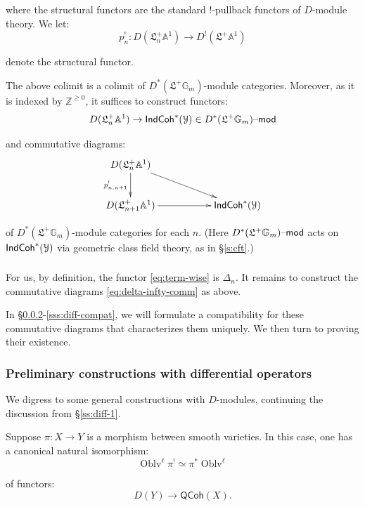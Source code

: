 \documentclass[reqno,11pt]{amsart}
\numberwithin{equation}{subsection}
\theoremstyle{remark}
\newcommand{\bA}{{\mathbb A}}
\newcommand{\bG}{{\mathbb G}}
\newcommand{\bZ}{{\mathbb Z}}
\newcommand{\sY}{{\EuScript Y}}
\newcommand{\fL}{{\mathfrak L}}
\newcommand{\on}{\operatorname}
\newcommand{\mathendash}{\text{\textendash}}
\renewcommand{\mod}{\mathendash\mathsf{mod}}
\newcommand{\Oblv}{\on{Oblv}}
\newcommand{\IndCoh}{\mathsf{IndCoh}}
\newcommand{\QCoh}{\mathsf{QCoh}}
\begin{document}
\noindent where the structural functors are the standard 
$!$-pullback functors of $D$-module theory. We let: 
%
\[
p_n^!: D(\fL_n^+\bA^1) \to 
D^!(\fL^+\bA^1)
\]

\noindent denote the structural functor.

The above colimit is a colimit of $D^*(\fL^+\bG_m)$-module categories.
Moreover, as it is indexed by $\bZ^{\geq 0}$, it suffices to 
construct functors:
%
\begin{equation}\label{eq:term-wise}
D(\fL_n^+\bA^1) \to \IndCoh^*(\sY) \in 
D^*(\fL^+\bG_m)\mod 
\end{equation}

\noindent and commutative diagrams:
%
\begin{equation}\label{eq:delta-infty-comm}
\vcenter{\xymatrix{
D(\fL_n^+\bA^1) \ar[drr]\ar[d]_{p_{n,n+1}^!} && \\ 
D(\fL_{n+1}^+\bA^1) \ar[rr] && \IndCoh^*(\sY) 
}}
\end{equation}

\noindent of $D^*(\fL^+\bG_m)$-module categories for each $n$.
(Here $D^*(\fL^+\bG_m)\mod $ acts on $\IndCoh^*(\sY)$ via
geometric class field theory, as in \S \ref{s:cft}.)

\subsubsection{}

For us, by definition, the functor \eqref{eq:term-wise}
is $\Delta_n$. It remains to construct the commutative 
diagrams \eqref{eq:delta-infty-comm} as above. 

In \S \ref{sss:diff-func}-\ref{sss:diff-compat}, we will formulate 
a compatibility for these commutative diagrams that 
characterizes them uniquely. We then turn to proving their existence.

\subsubsection{Preliminary constructions with differential operators}\label{sss:diff-func}

We digress to some general constructions with $D$-modules, continuing
the discussion from \S \ref{ss:diff-1}. 

Suppose $\pi:X \to Y$ is a morphism between smooth varieties. In this
case, one has a canonical natural isomorphism:
%
\[
\Oblv^{\ell} \pi^! \simeq \pi^*\Oblv^{\ell}
\]

\noindent of functors:
%
\[
D(Y) \to \QCoh(X).
\]
\end{document}
